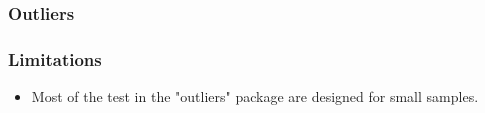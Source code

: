\documentclass{beamer}
\begin{document}



\begin{frame}[fragile]
\frametitle{Outliers}
\Large
\frametitle{Limitations}
\begin{itemize}
\item Most of the test in the "outliers" package are designed for small samples. 
\end{itemize}
\end{frame}
\end{document}
